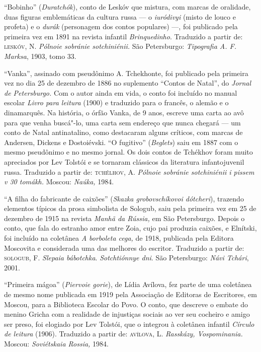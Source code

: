 \medskip

``Bobinho'' (\emph{Duratchók}), conto de Leskóv que mistura, com marcas
de oralidade, duas figuras
emblemáticas da cultura russa --- o \emph{iuródivyi} (misto de louco e
profeta) e o \emph{durák} (personagem dos contos populares) ---, foi
publicado pela primeira vez em 1891 na revista infantil
\emph{Brinquedinho}. Traduzido a partir de:
\textsc{leskóv}, N. \emph{Pólnoie sobránie sotchiniénii.} São Petersburgo:
\emph{Tipografia A. F. Marksa}, 1903, tomo 33.

\medskip

``Vanka'', assinado com pseudônimo A. Tchekhonte, foi publicado pela
primeira vez no dia 25 de dezembro de 1886 no suplemento ``Contos de
Natal'', do \emph{Jornal de Petersburgo.} Com o autor ainda em vida, o
conto foi incluído no manual escolar \emph{Livro para leitura} (1900) e
traduzido para o francês, o alemão e o dinamarquês. Na história, o órfão
Vanka, de 9 anos, escreve uma carta ao avô para que venha buscá"-lo, uma
carta sem endereço que nunca chegará --- um conto de Natal
antinatalino, como destacaram alguns críticos, com marcas de Andersen,
Dickens e Dostoiévski. ``O fugitivo'' (\emph{Beglets}) saiu em 1887 com
o mesmo pseudônimo e no mesmo jornal. Os dois contos de Tchékhov foram muito
apreciados por Lev Tolstói e se tornaram clássicos da literatura
infantojuvenil russa.
Traduzido a partir de:
\textsc{tchélhov}, A. \emph{Pólnoie sobránie sotchiniénii i pissem v 30 tomákh.}
Moscou: \emph{Naúka,} 1984.

\medskip

``A filha do fabricante de caixões'' (\emph{Skazka grobovschíkovoi
dótcheri}), trazendo elementos típicos da prosa simbolista de Sologub,
saiu pela primeira vez em 25 de dezembro de 1915 na revista \emph{Manhã
da Rússia,} em São Petersburgo. Depois o conto, que fala do estranho
amor entre Zoia, cujo pai produzia caixões, e Elnítski, foi incluído na
coletânea \emph{A borboleta cega,} de 1918, publicada pela Editora
Moscovita e considerada uma das melhores do escritor.
Traduzido a partir de:
\textsc{sologub}, F. \emph{Slepaia bábotchka}. \emph{Sotchtiónnye dni}. São
Petersburgo: \emph{Návi Tchári}, 2001.

\medskip

``Primeira mágoa'' (\emph{Piervoie gorie}), de Lídia Avílova,
fez parte de uma coletânea de
mesmo nome publicada em 1919 pela Associação de Editoras de
Escritores, em Moscou, para a Biblioteca Escolar do Povo. O
conto, que descreve o embate do menino Gricha com a realidade de
injustiças sociais ao ver seu cocheiro e amigo ser preso, foi elogiado
por Lev Tolstói, que o integrou à coletânea infantil \emph{Círculo de
leitura} (1906).
Traduzido a partir de:
\textsc{avílova}, L. \emph{Rasskázy, Vospominania.} Moscou: \emph{Soviétskaia
Rossia,} 1984.

